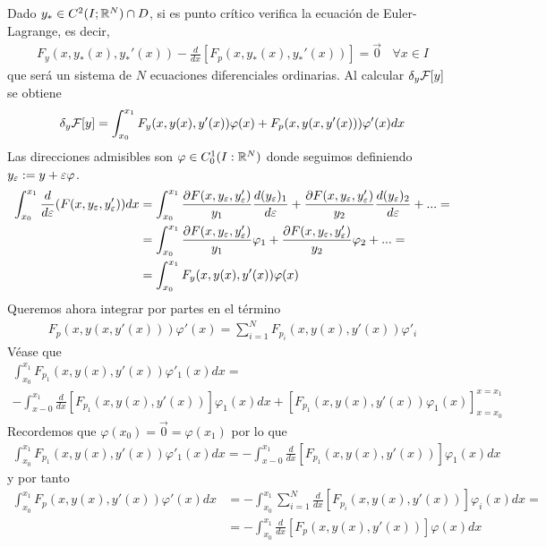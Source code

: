 Dado $y_*\in C^2(I;\mathbb{R}^N)\cap D$, si es punto crítico verifica la ecuación de Euler-Lagrange, es decir, 
\begin{gather*}
    F_y(x,y_*(x), y_*'(x)) - \frac{d}{dx} [F_p(x,y_*(x), y_*'(x))] = \vec{0}\ \ \ \ \forall x \in I
\end{gather*}
que será un sistema de $N$ ecuaciones diferenciales ordinarias. Al calcular $\delta_y\mathcal{F}[y]$ se obtiene 
 \begin{gather*}
    \delta_y\mathcal{F}[y] = \int_{x_0}^{x_1} F_y(x,y(x), y'(x)) \varphi(x) + F_p(x,y(x, y'(x))) \varphi'(x) dx
 \end{gather*}
 Las direcciones admisibles son $\varphi \in C_0^1(I:\mathbb{R}^N)$ donde seguimos definiendo $y_\varepsilon := y + \varepsilon \varphi$.
 \begin{align*}
    \int_{x_0}^{x_1} \frac{d}{d\varepsilon}(F(x,y_\varepsilon, y'_\varepsilon)) dx &= \int_{x_0}^{x_1} \frac{\partial F(x,y_\varepsilon, y'_\varepsilon)}{y_1} \frac{d(y_\varepsilon)_1}{d \varepsilon} + \frac{\partial F(x,y_\varepsilon, y'_\varepsilon)}{y_2} \frac{d(y_\varepsilon)_2}{d \varepsilon} + ... = \\
    &= \int_{x_0}^{x_1} \frac{\partial F(x,y_\varepsilon, y'_\varepsilon)}{y_1} \varphi_1 + \frac{\partial F(x,y_\varepsilon, y'_\varepsilon)}{y_2} \varphi_2 + ... = \\
    &= \int_{x_0}^{x_1} F_y(x,y(x), y'(x)) \varphi(x)
 \end{align*}
 Queremos ahora integrar por partes en el término
 \begin{gather*}
    F_p(x,y(x, y'(x))) \varphi'(x) = \sum_{i=1}^{N}F_{p_i}(x, y(x), y'(x))\varphi'_i
 \end{gather*}
 Véase que 
 \begin{gather*}
    \int_{x_0}^{x_1} F_{p_1}(x, y(x), y'(x)) \varphi'_1(x) dx = \\
    - \int_{x-0}^{x_1} \frac{d}{dx} [F_{p_1}(x,y(x), y'(x))]\varphi_1(x) dx + \left[ F_{p_1}(x,y(x), y'(x)) \varphi_1(x)\right]_{x=x_0}^{x=x_1} 
 \end{gather*}
 Recordemos que $\varphi(x_0) = \vec{0} = \varphi(x_1)$ por lo que 
 \begin{gather*}
    \int_{x_0}^{x_1} F_{p_1}(x, y(x), y'(x)) \varphi'_1(x) dx =
    - \int_{x-0}^{x_1} \frac{d}{dx} [F_{p_1}(x,y(x), y'(x))]\varphi_1(x) dx
 \end{gather*}
 y por tanto 
 \begin{align*}
    \int_{x_0}^{x_1} F_p(x, y(x), y'(x)) \varphi'(x) dx &= - \int_{x_0}^{x_1} \sum_{i=1}^N \frac{d}{dx} [F_{p_i}(x, y(x), y'(x))] \varphi_i(x) dx =\\
    &= -\int_{x_0}^{x_1} \frac{d}{dx} [F_p(x, y(x), y'(x))]\varphi(x) dx
 \end{align*}

